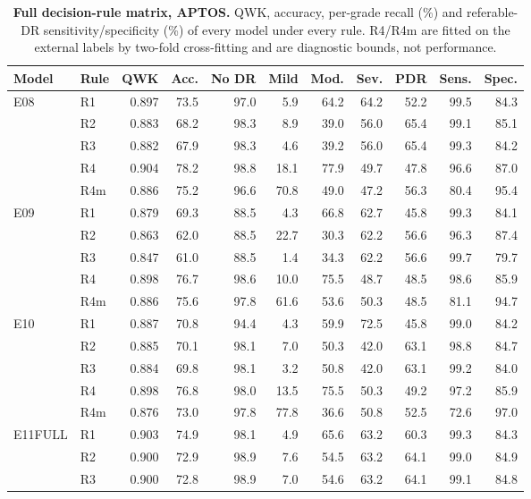\begin{table}[h]
\caption{\textbf{Full decision-rule matrix, APTOS.} QWK, accuracy, per-grade recall (\%) and referable-DR sensitivity/specificity (\%) of every model under every rule. R4/R4m are fitted on the external labels by two-fold cross-fitting and are diagnostic bounds, not performance.}\label{tab:rules_aptos}
\centering\scriptsize
\begin{tabular}{@{}llrrrrrrrrr@{}}
\toprule
Model & Rule & QWK & Acc. & No DR & Mild & Mod. & Sev. & PDR & Sens. & Spec. \\
\midrule
E08 & R1 & 0.897 & 73.5 & 97.0 & 5.9 & 64.2 & 64.2 & 52.2 & 99.5 & 84.3 \\
 & R2 & 0.883 & 68.2 & 98.3 & 8.9 & 39.0 & 56.0 & 65.4 & 99.1 & 85.1 \\
 & R3 & 0.882 & 67.9 & 98.3 & 4.6 & 39.2 & 56.0 & 65.4 & 99.3 & 84.2 \\
 & R4 & 0.904 & 78.2 & 98.8 & 18.1 & 77.9 & 49.7 & 47.8 & 96.6 & 87.0 \\
 & R4m & 0.886 & 75.2 & 96.6 & 70.8 & 49.0 & 47.2 & 56.3 & 80.4 & 95.4 \\
\addlinespace
E09 & R1 & 0.879 & 69.3 & 88.5 & 4.3 & 66.8 & 62.7 & 45.8 & 99.3 & 84.1 \\
 & R2 & 0.863 & 62.0 & 88.5 & 22.7 & 30.3 & 62.2 & 56.6 & 96.3 & 87.4 \\
 & R3 & 0.847 & 61.0 & 88.5 & 1.4 & 34.3 & 62.2 & 56.6 & 99.7 & 79.7 \\
 & R4 & 0.898 & 76.7 & 98.6 & 10.0 & 75.5 & 48.7 & 48.5 & 98.6 & 85.9 \\
 & R4m & 0.886 & 75.6 & 97.8 & 61.6 & 53.6 & 50.3 & 48.5 & 81.1 & 94.7 \\
\addlinespace
E10 & R1 & 0.887 & 70.8 & 94.4 & 4.3 & 59.9 & 72.5 & 45.8 & 99.0 & 84.2 \\
 & R2 & 0.885 & 70.1 & 98.1 & 7.0 & 50.3 & 42.0 & 63.1 & 98.8 & 84.7 \\
 & R3 & 0.884 & 69.8 & 98.1 & 3.2 & 50.8 & 42.0 & 63.1 & 99.2 & 84.0 \\
 & R4 & 0.898 & 76.8 & 98.0 & 13.5 & 75.5 & 50.3 & 49.2 & 97.2 & 85.9 \\
 & R4m & 0.876 & 73.0 & 97.8 & 77.8 & 36.6 & 50.8 & 52.5 & 72.6 & 97.0 \\
\addlinespace
E11FULL & R1 & 0.903 & 74.9 & 98.1 & 4.9 & 65.6 & 63.2 & 60.3 & 99.3 & 84.3 \\
 & R2 & 0.900 & 72.9 & 98.9 & 7.6 & 54.5 & 63.2 & 64.1 & 99.0 & 84.9 \\
 & R3 & 0.900 & 72.8 & 98.9 & 7.0 & 54.6 & 63.2 & 64.1 & 99.1 & 84.8 \\

\end{tabular}
\end{table}
